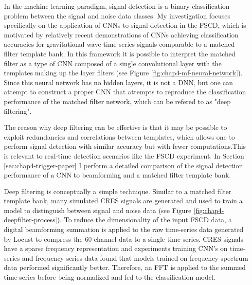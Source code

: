 In the machine learning paradigm, signal detection is a binary classification problem between the signal and noise data classes. My investigation focuses specifically on the application of CNNs to signal detection in the FSCD, which is motivated by relatively recent demonstrations of CNNs achieving classification accuracies for gravitational wave time-series signals comparable to a matched filter template bank. In this framework it is possible to interpret the matched filter as a type of CNN composed of a single convolutional layer with the templates making up the layer filters (see Figure \ref{fig:chap4-mf-neural-network}). Since this neural network has no hidden layers, it is not a DNN, but one can attempt to construct a proper CNN that attempts to reproduce the classification performance of the matched filter network, which can be refered to as "deep filtering".

The reason why deep filtering can be effective is that it may be possible to exploit redundancies and correlations between templates, which allows one to perform signal detection with similar accuracy but with fewer computations.This is relevant to real-time detection scenarios like the FSCD experiment. In Section \ref{sec:chap4-trigger-paper} I perform a detailed comparison of the signal detection performance of a CNN to beamforming and a matched filter template bank.

Deep filtering is conceptually a simple technique. Similar to a matched filter template bank, many simulated CRES signals are generated and used to train a model to distinguish between signal and noise data (see Figure \ref{fig:chap4-deepfilter-process}). To reduce the dimensionality of the input FSCD data, a digital beamforming summation is applied to the raw time-series data generated by Locust to compress the 60-channel data to a single time-series. CRES signals have a sparse frequency representation and experiments training CNN's on time-series and frequency-series data found that models trained on frequency spectrum data performed significantly better. Therefore, an FFT is applied to the summed time-series before being normalized and fed to the classification model.

